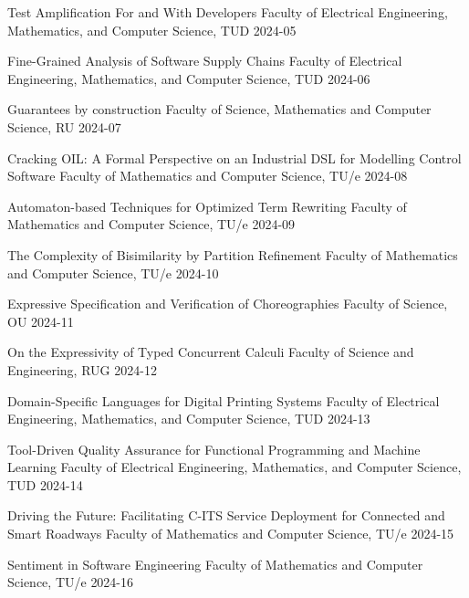 \begin{multicols}{2}
         {Test Amplification For and With Developers}
         {Faculty of Electrical Engineering, Mathematics, and Computer Science, TUD}
         {2024-05}
         
         {Fine-Grained Analysis of Software Supply Chains}
         {Faculty of Electrical Engineering, Mathematics, and Computer Science, TUD}
         {2024-06}

         {Guarantees by construction}
         {Faculty of Science, Mathematics and Computer Science, RU}
         {2024-07}

         {Cracking OIL: A Formal Perspective on an Industrial DSL for Modelling Control Software}
         {Faculty of Mathematics and Computer Science, TU/e}
         {2024-08}
         
         {Automaton-based Techniques for Optimized Term Rewriting}
         {Faculty of Mathematics and Computer Science, TU/e}
         {2024-09}
         
         {The Complexity of Bisimilarity by Partition Refinement}
         {Faculty of Mathematics and Computer Science, TU/e}
         {2024-10}

         {Expressive Specification and Verification of Choreographies}
         {Faculty of Science, OU}
         {2024-11}

         {On the Expressivity of Typed Concurrent Calculi}
         {Faculty of Science and Engineering, RUG}
         {2024-12}

         {Domain-Specific Languages for Digital Printing Systems}
         {Faculty of Electrical Engineering, Mathematics, and Computer Science, TUD}
         {2024-13}
         
         {Tool-Driven Quality Assurance for Functional Programming and Machine Learning}
         {Faculty of Electrical Engineering, Mathematics, and Computer Science, TUD}
         {2024-14}
         
         {Driving the Future: Facilitating C-ITS Service Deployment for Connected and Smart Roadways}
         {Faculty of Mathematics and Computer Science, TU/e}
         {2024-15}

         {Sentiment in Software Engineering}
         {Faculty of Mathematics and Computer Science, TU/e}
         {2024-16}
         

\end{multicols}
